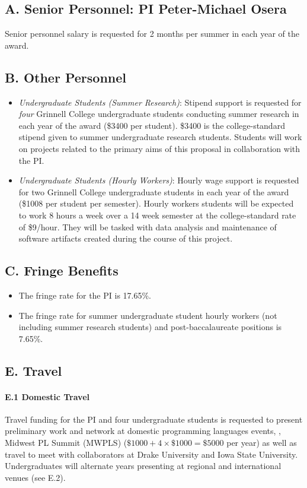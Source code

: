 \documentclass[11pt]{article}
\begin{document}
\smalltitle{}

\subsection*{A. Senior Personnel: PI Peter-Michael Osera}
Senior personnel salary is requested for 2 months per summer in each year of the award.

\subsection*{B. Other Personnel}
\begin{itemize}[itemsep=0pt]
  \item \emph{Undergraduate Students (Summer Research)}: Stipend support is requested for \emph{four} Grinnell College undergraduate students conducting summer research in each year of the award (\$3400 per student).
    \$3400 is the college-standard stipend given to summer undergraduate research students.
    Students will work on projects related to the primary aims of this proposal in collaboration with the PI.
  \item \emph{Undergraduate Students (Hourly Workers)}: Hourly wage support is requested for two Grinnell College undergraduate students in each year of the award (\$1008 per student per semester).
    Hourly workers students will be expected to work 8 hours a week over a 14 week semester at the college-standard rate of \$9/hour.
    They will be tasked with data analysis and maintenance of software artifacts created during the course of this project.
\end{itemize}

\subsection*{C. Fringe Benefits}
\begin{itemize}[itemsep=0ex]
  \item The fringe rate for the PI is 17.65\%.
  \item The fringe rate for summer undergraduate student hourly workers (not including summer research students) and post-baccalaureate positions is 7.65\%.
\end{itemize}

\subsection*{E. Travel}

\paragraph{E.1 Domestic Travel}
Travel funding for the PI and four undergraduate students is requested to present preliminary work and network at domestic programming languages events, \eg, Midwest PL Summit (MWPLS) (\( \$1000 + 4 × \$1000 = \$5000 \) per year) as well as travel to meet with collaborators at Drake University and Iowa State University.
Undergraduates will alternate years presenting at regional and international venues (see E.2).
\end{document}
